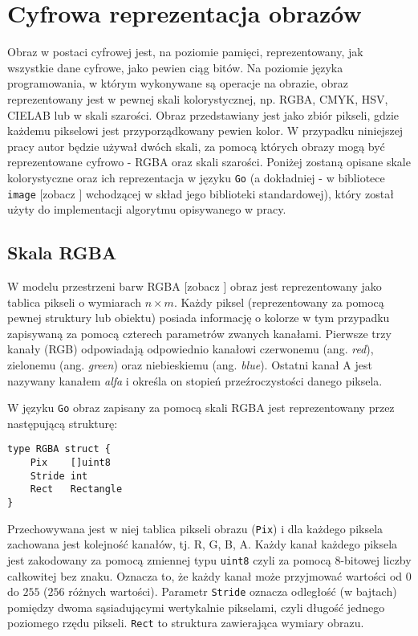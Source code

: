 \section{Cyfrowa reprezentacja obrazów}

Obraz w postaci cyfrowej jest, na poziomie pamięci, reprezentowany, jak wszystkie dane cyfrowe, jako pewien ciąg bitów. Na poziomie języka programowania, w którym wykonywane są operacje na obrazie, obraz reprezentowany jest w pewnej skali kolorystycznej, np. RGBA, CMYK, HSV, CIELAB lub w skali szarości. Obraz przedstawiany jest jako zbiór pikseli, gdzie każdemu pikselowi jest przyporządkowany pewien kolor. W przypadku niniejszej pracy autor będzie używał dwóch skali, za pomocą których obrazy mogą być reprezentowane cyfrowo - RGBA oraz skali szarości. Poniżej zostaną opisane skale kolorystyczne oraz ich reprezentacja w języku \texttt{Go} (a dokładniej - w bibliotece \texttt{image} [zobacz \cite{GoDocsImage}] wchodzącej w skład jego biblioteki standardowej), który został użyty do implementacji algorytmu opisywanego w pracy.

\subsection{Skala RGBA}

W modelu przestrzeni barw RGBA [zobacz \cite{RGBASpecification}] obraz jest reprezentowany jako tablica pikseli o wymiarach $n \times m$. Każdy piksel (reprezentowany za pomocą pewnej struktury lub obiektu) posiada informację o kolorze w tym przypadku zapisywaną za pomocą czterech parametrów zwanych kanałami. Pierwsze trzy kanały (RGB) odpowiadają odpowiednio kanałowi czerwonemu (ang. \textit{red}), zielonemu (ang. \textit{green}) oraz niebieskiemu (ang. \textit{blue}). Ostatni kanał A jest nazywany kanałem \textit{alfa} i określa on stopień przeźroczystości danego piksela.

W języku \texttt{Go} obraz zapisany za pomocą skali RGBA jest reprezentowany przez następującą strukturę:
\begin{lstlisting}
type RGBA struct {
    Pix    []uint8
    Stride int
    Rect   Rectangle
}
\end{lstlisting}
Przechowywana jest w niej tablica pikseli obrazu (\texttt{Pix}) i dla każdego piksela zachowana jest kolejność kanałów, tj. R, G, B, A. Każdy kanał każdego piksela jest zakodowany za pomocą zmiennej typu \texttt{uint8} czyli za pomocą 8-bitowej liczby całkowitej bez znaku. Oznacza to, że każdy kanał może przyjmować wartości od $0$ do $255$ ($256$ różnych wartości). Parametr \texttt{Stride} oznacza odległość  (w bajtach) pomiędzy dwoma sąsiadującymi wertykalnie pikselami, czyli długość jednego poziomego rzędu pikseli. \texttt{Rect} to struktura zawierająca wymiary obrazu.

